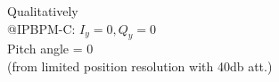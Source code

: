 \documentclass[a4paper,11pt]{book}
\begin{document}
\begin{minipage}{0.5\textwidth}
\end{minipage}\hfill\hspace*{-2cm}
\begin{minipage}{0.5\textwidth}
Qualitatively\\
@IPBPM-C: $I_y=0, Q_y=0$\\
Pitch angle = 0\\
(from limited position resolution with 40db att.)
\end{minipage}\\
\end{document}

